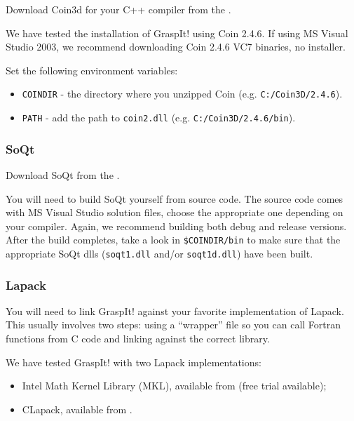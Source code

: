 Download Coin3d for your C++ compiler from the .

We have tested the installation of GraspIt! using Coin 2.4.6. If using
MS Visual Studio 2003, we recommend downloading Coin 2.4.6 VC7
binaries, no installer.

Set the following environment variables:

\begin{itemize}
\item \texttt{COINDIR} - the directory where you unzipped Coin (e.g. \texttt{C:/Coin3D/2.4.6}).
\item \texttt{PATH} - add the path to \texttt{coin2.dll} (e.g. \texttt{C:/Coin3D/2.4.6/bin}).
\end{itemize}

\subsubsection{SoQt}

Download SoQt from the .

You will need to build SoQt yourself from source code. The source code
comes with MS Visual Studio solution files, choose the appropriate one
depending on your compiler. Again, we recommend building both debug
and release versions. After the build completes, take a look in
\texttt{\$COINDIR/bin} to make sure that the appropriate SoQt dlls (\texttt{soqt1.dll} and/or \texttt{soqt1d.dll}) have been built.

\subsubsection{Lapack}

You will need to link GraspIt! against your favorite implementation of
Lapack. This usually involves two steps: using a ``wrapper'' file so
you can call Fortran functions from C code and linking against the
correct library.

We have tested GraspIt! with two Lapack implementations:
\begin{itemize}
\item Intel Math Kernel Library (MKL), available from
  (free trial available);
\item CLapack, available from
  .
\end{itemize}

